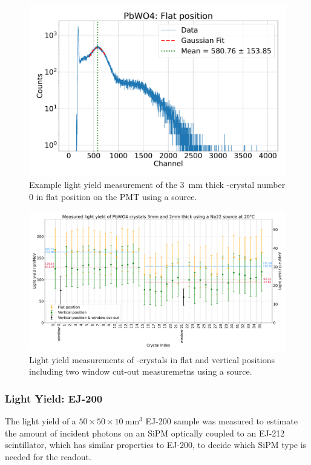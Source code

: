 \begin{figure}[h]
    \centering
    \includegraphics[width=0.5\linewidth]{fig/lightyield/pwo/bps_na_flat.pdf}
    \caption{Example light yield measurement of the \SI{3}{\milli\meter} thick -crystal number 0 in flat position on the \gls{PMT} using a  source.}\label{fig:lightyield:pwo:measurement:0}
\end{figure}

\begin{figure}[h]
    \centering
    \includegraphics[width=1\linewidth]{fig/lightyield/pwo/bps_na22_all.pdf}
    \caption{Light yield measurements of -crystals in flat and vertical positions including two window cut-out measuremetns using a  source.}\label{fig:lightyield:pwo:measurement:all}
\end{figure}

\subsubsection{Light Yield: EJ-200}
The light yield of a $50 \times 50 \times 10~ \si{\milli\meter\cubed}$ EJ-200 sample was measured to estimate the amount of incident photons on an SiPM optically coupled to an EJ-212 scintillator, which has similar properties to EJ-200, to decide which SiPM type is needed for the readout.

